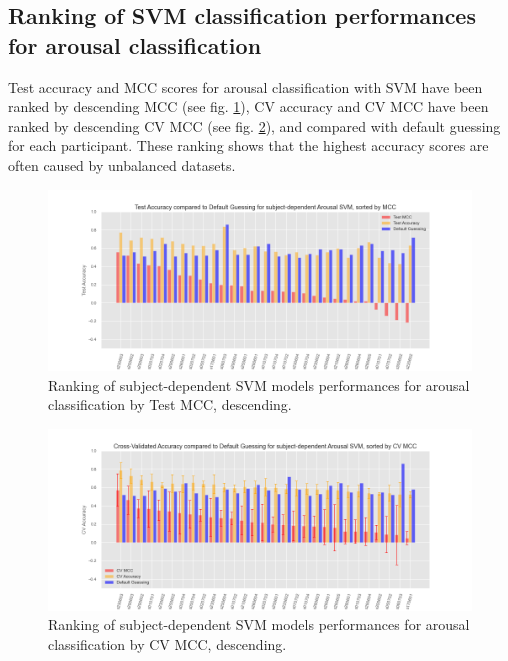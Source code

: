 \subsection{Ranking of SVM classification performances for arousal classification}
\label{sec:appendix_A4.1}
Test accuracy and \ac{MCC} scores for arousal classification with \ac{SVM} have been ranked by descending \ac{MCC} (see fig. \ref{fig:test_acc_mcc_arousal_svm}), CV accuracy and \ac{CV MCC} have been ranked by descending \ac{CV MCC} (see fig. \ref{fig:test_cv_acc_mcc_arousal_svm}), and compared with default guessing for each participant. These ranking shows that the highest accuracy scores are often caused by unbalanced datasets. 


\begin{figure}[!htb]
\includegraphics[width=16cm]{img/appendix/final_experiment/test_acc_mcc_arousal_svm.png}
\centering
\caption{Ranking of subject-dependent SVM models performances for arousal classification by Test MCC, descending.}\label{fig:test_acc_mcc_arousal_svm}
\end{figure}

\begin{figure}[!htb]
\includegraphics[width=16cm]{img/appendix/final_experiment/test_cv_acc_mcc_arousal_svm.png}
\centering
\caption{Ranking of subject-dependent SVM models performances for arousal classification by CV MCC, descending.}\label{fig:test_cv_acc_mcc_arousal_svm}
\end{figure}
\FloatBarrier

